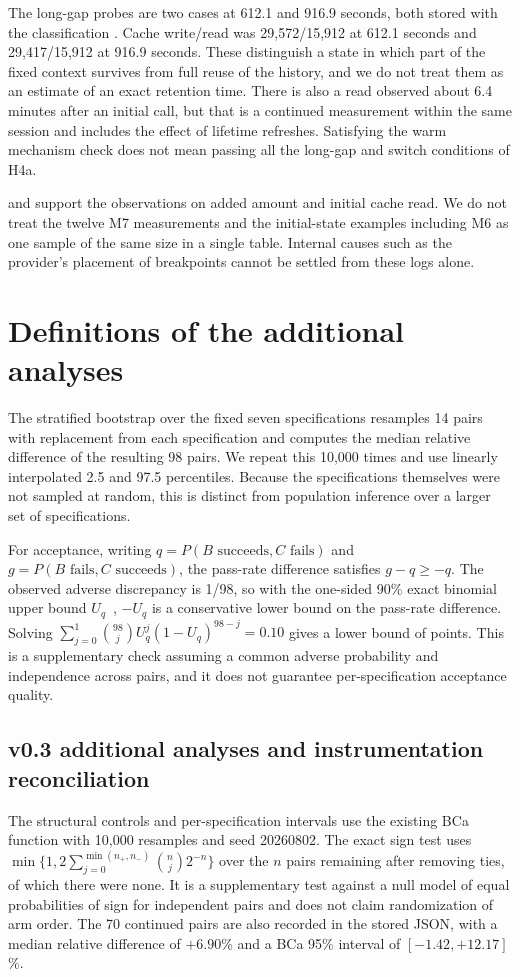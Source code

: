 \documentclass[a4paper,11pt]{article}
\newcommand{\spec}[1]{\texttt{\detokenize{#1}}}
\begin{document}
The long-gap probes are two cases at 612.1 and 916.9 seconds, both stored with the classification \spec{ambiguous}. Cache write/read was 29{,}572/15{,}912 at 612.1 seconds and 29{,}417/15{,}912 at 916.9 seconds. These distinguish a state in which part of the fixed context survives from full reuse of the history, and we do not treat them as an estimate of an exact retention time. There is also a read observed about 6.4 minutes after an initial call, but that is a continued measurement within the same session and includes the effect of lifetime refreshes. Satisfying the warm mechanism check does not mean passing all the long-gap and switch conditions of H4a.

\spec{m6_results.jsonl} and \spec{m7_results.jsonl} support the observations on added amount and initial cache read. We do not treat the twelve M7 measurements and the initial-state examples including M6 as one sample of the same size in a single table. Internal causes such as the provider's placement of breakpoints cannot be settled from these logs alone.

\section{Definitions of the additional analyses}\label{app:supplement}
The stratified bootstrap over the fixed seven specifications resamples 14 pairs with replacement from each specification and computes the median relative difference of the resulting 98 pairs. We repeat this 10{,}000 times and use linearly interpolated 2.5 and 97.5 percentiles. Because the specifications themselves were not sampled at random, this is distinct from population inference over a larger set of specifications.

For acceptance, writing $q=P(B\text{ succeeds},C\text{ fails})$ and $g=P(B\text{ fails},C\text{ succeeds})$, the pass-rate difference satisfies $g-q\geq-q$. The observed adverse discrepancy is 1/98, so with the one-sided 90\% exact binomial upper bound $U_q$~\cite{clopper}, $-U_q$ is a conservative lower bound on the pass-rate difference. Solving $\sum_{j=0}^{1}\binom{98}{j}U_q^j(1-U_q)^{98-j}=0.10$ gives a lower bound of \QualityExact{} points. This is a supplementary check assuming a common adverse probability and independence across pairs, and it does not guarantee per-specification acceptance quality.

\subsection{v0.3 additional analyses and instrumentation reconciliation}
The structural controls and per-specification intervals use the existing BCa function with 10{,}000 resamples and seed 20260802. The exact sign test uses $\min\{1,2\sum_{j=0}^{\min(n_+,n_-)}\binom{n}{j}2^{-n}\}$ over the $n$ pairs remaining after removing ties, of which there were none. It is a supplementary test against a null model of equal probabilities of sign for independent pairs and does not claim randomization of arm order. The 70 continued pairs are also recorded in the stored JSON, with a median relative difference of $+6.90$\% and a BCa 95\% interval of $[-1.42,+12.17]$\%.
\end{document}
